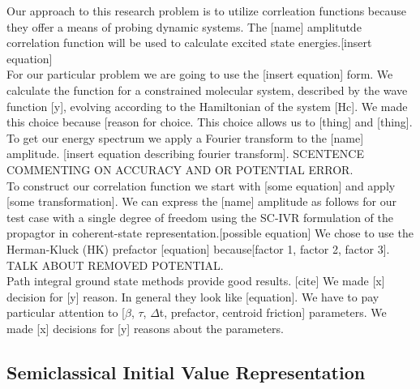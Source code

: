 \documentclass[12pt,letterpaper, oneside, draft]{article}              %
\numberwithin{equation}{section} %
\begin{document}
Our approach to this research problem is to utilize corrleation functions because they offer a means of probing dynamic systems. The [name] amplitutde correlation function will be used to calculate excited state energies.[insert equation]\\
For our particular problem we are going to use the [insert equation] form. We calculate the function for a constrained molecular system, described by the wave function [y], evolving according to the Hamiltonian of the system [Hc]. We made this choice because [reason for choice. This choice allows us to [thing] and [thing]. \\
To get our energy spectrum we apply a Fourier transform to the [name] amplitude. [insert equation describing fourier transform]. SCENTENCE COMMENTING ON ACCURACY AND OR POTENTIAL ERROR. \\

To construct our correlation function we start with [some equation] and apply [some transformation]. We can express the [name] amplitude as follows for our test case with a single degree of freedom using the SC-IVR formulation of the propagtor in coherent-state representation.[possible equation] We chose to use the Herman-Kluck (HK) prefactor [equation] because[factor 1, factor 2, factor 3].~\cite{kay2006herman} TALK ABOUT REMOVED POTENTIAL. \\

Path integral ground state methods provide good results. [cite] We made [x] decision for [y] reason. In general they look like [equation]. We have to pay particular attention to [$\beta$, $\tau$, $\Delta$t, prefactor, centroid friction] parameters. We made [x] decisions for [y] reasons about the parameters.

\subsection*{Semiclassical Initial Value Representation}
\end{document}
